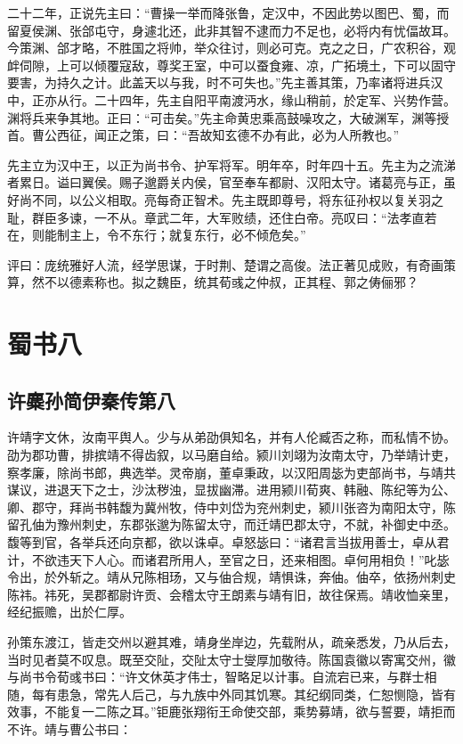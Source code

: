 \documentclass[12pt,UTF8]{ctexbook}
\begin{document}
二十二年，正说先主曰：“曹操一举而降张鲁，定汉中，不因此势以图巴、蜀，而留夏侯渊、张郃屯守，身遽北还，此非其智不逮而力不足也，必将内有忧偪故耳。今策渊、郃才略，不胜国之将帅，举众往讨，则必可克。克之之日，广农积谷，观衅伺隙，上可以倾覆寇敌，尊奖王室，中可以蚕食雍、凉，广拓境土，下可以固守要害，为持久之计。此盖天以与我，时不可失也。”先主善其策，乃率诸将进兵汉中，正亦从行。二十四年，先主自阳平南渡沔水，缘山稍前，於定军、兴势作营。渊将兵来争其地。正曰：“可击矣。”先主命黄忠乘高鼓噪攻之，大破渊军，渊等授首。曹公西征，闻正之策，曰：“吾故知玄德不办有此，必为人所教也。”

先主立为汉中王，以正为尚书令、护军将军。明年卒，时年四十五。先主为之流涕者累日。谥曰翼侯。赐子邈爵关内侯，官至奉车都尉、汉阳太守。诸葛亮与正，虽好尚不同，以公义相取。亮每奇正智术。先主既即尊号，将东征孙权以复关羽之耻，群臣多谏，一不从。章武二年，大军败绩，还住白帝。亮叹曰：“法孝直若在，则能制主上，令不东行；就复东行，必不倾危矣。”

评曰：庞统雅好人流，经学思谋，于时荆、楚谓之高俊。法正著见成败，有奇画策算，然不以德素称也。拟之魏臣，统其荀彧之仲叔，正其程、郭之俦俪邪？

\part{蜀书八}
\chapter{许麋孙简伊秦传第八}

许靖字文休，汝南平舆人。少与从弟劭俱知名，并有人伦臧否之称，而私情不协。劭为郡功曹，排摈靖不得齿叙，以马磨自给。颍川刘翊为汝南太守，乃举靖计吏，察孝廉，除尚书郎，典选举。灵帝崩，董卓秉政，以汉阳周毖为吏部尚书，与靖共谋议，进退天下之士，沙汰秽浊，显拔幽滞。进用颍川荀爽、韩融、陈纪等为公、卿、郡守，拜尚书韩馥为冀州牧，侍中刘岱为兖州刺史，颍川张咨为南阳太守，陈留孔伷为豫州刺史，东郡张邈为陈留太守，而迁靖巴郡太守，不就，补御史中丞。馥等到官，各举兵还向京都，欲以诛卓。卓怒毖曰：“诸君言当拔用善士，卓从君计，不欲违天下人心。而诸君所用人，至官之日，还来相图。卓何用相负！”叱毖令出，於外斩之。靖从兄陈相玚，又与伷合规，靖惧诛，奔伷。伷卒，依扬州刺史陈祎。祎死，吴郡都尉许贡、会稽太守王朗素与靖有旧，故往保焉。靖收恤亲里，经纪振赡，出於仁厚。

孙策东渡江，皆走交州以避其难，靖身坐岸边，先载附从，疏亲悉发，乃从后去，当时见者莫不叹息。既至交阯，交阯太守士燮厚加敬待。陈国袁徽以寄寓交州，徽与尚书令荀彧书曰：“许文休英才伟士，智略足以计事。自流宕已来，与群士相随，每有患急，常先人后己，与九族中外同其饥寒。其纪纲同类，仁恕恻隐，皆有效事，不能复一二陈之耳。”钜鹿张翔衔王命使交部，乘势募靖，欲与誓要，靖拒而不许。靖与曹公书曰：
\end{document}
